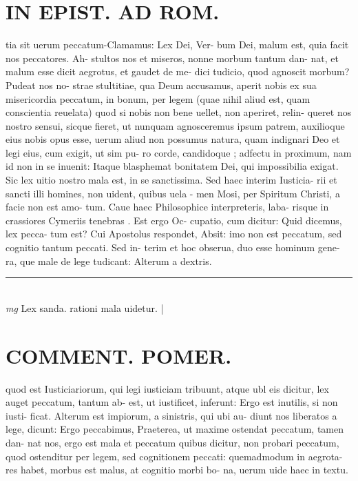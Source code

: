 \documentclass{article}
\begin{document}
\begin{pages}
\section*{IN EPIST. AD ROM.  }
\marginpar{[ p.72 ]}\pstart tia sit uerum peccatum-Clamamus: Lex Dei, Ver- bum Dei, malum est, quia facit nos peccatores. Ah- stultos nos et miseros, nonne morbum tantum dan- nat, et malum esse dicit aegrotus, et gaudet de me- dici tudicio, quod agnoscit morbum? Pudeat nos no- strae stultitiae, qua Deum accusamus, aperit nobis ex sua misericordia peccatum, in bonum, per legem (quae nihil aliud est, quam conscientia reuelata) quod si nobis non bene uellet, non aperiret, relin- queret nos nostro sensui, sicque fieret, ut nunquam agnosceremus ipsum patrem, auxilioque eius nobis opus esse, uerum aliud non possumus natura, quam indignari Deo et legi eius, cum exigit, ut sim pu- ro corde, candidoque ; adfectu in proximum, nam id non in se inuenit: Itaque blasphemat bonitatem Dei, qui impossibilia exigat. Sic lex uitio nostro mala est, in se sanctissima. Sed haec interim Iusticia- rii et sancti illi homines, non uident, quibus uela - men Mosi, per Spiritum Christi, a facie non est amo- tum. Caue haec Philosophice interpreteris, laba- risque in crassiores Cymeriis tenebras . Est ergo Oc- cupatio, cum dicitur: Quid dicemus, lex pecca- tum est? Cui Apostolus respondet, Absit: imo non est peccatum, sed cognitio tantum peccati. Sed in- terim et hoc obserua, duo esse hominum gene- ra, que male de lege tudicant: Alterum a dextris.  \pend
\vspace{0.5cm}\noindent
\vspace{0.2cm}\rule{1cm}{0.2pt}\\ 
\hspace{0.2cm}\textit{mg}
\footnotesize Lex sanda. rationi mala uidetur.  
\normalsize| 
\section*{COMMENT. POMER.  }\pstart quod est Iusticiariorum, qui legi iusticiam tribuunt, atque ubl eis dicitur, lex auget peccatum, tantum ab- est, ut iustificet, inferunt: Ergo est inutilis, si non iusti- ficat. Alterum est impiorum, a sinistris, qui ubi au- diunt nos liberatos a lege, dicunt: Ergo peccabimus, Praeterea, ut maxime ostendat peccatum, tamen dan- nat nos, ergo est mala et peccatum quibus dicitur, non probari peccatum, quod ostenditur per legem, sed cognitionem peccati: quemadmodum in aegrota- res habet, morbus est malus, at cognitio morbi bo- na, uerum uide haec in textu.   \pend
{}
{}

\end{pages}
\end{document}
